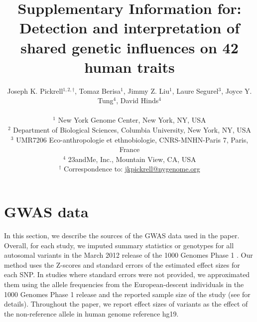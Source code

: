 \documentclass[11pt,titlepage]{article}
\begin{document}
\title{Supplementary Information for: Detection and interpretation of shared genetic influences on 42 human traits}
\author{Joseph K. Pickrell$^{1,2, \dagger}$, Tomaz Berisa${^1}$, Jimmy Z. Liu${^1}$, Laure Segurel$^{3}$, Joyce Y. Tung${^4}$, David Hinds${^4}$\\ \\
\small $^1$ New York Genome Center, New York, NY, USA\\
\small $^2$ Department of Biological Sciences, Columbia University, New York, NY, USA \\
\small $^3$ UMR7206 Eco-anthropologie et ethnobiologie, CNRS-MNHN-Paris 7, Paris, France\\
\small $^4$ 23andMe, Inc., Mountain View, CA, USA\\
\small $^\dagger$ Correspondence to: \url{jkpickrell@nygenome.org}
}
\maketitle

\tableofcontents
\clearpage

\section{GWAS data}
In this section, we describe the sources of the GWAS data used in the paper. Overall, for each study, we imputed summary statistics or genotypes for all autosomal variants in the March 2012 release of the 1000 Genomes Phase 1 \citep{abecasis2010map}. Our method uses the Z-scores and standard errors of the estimated effect sizes for each SNP. In studies where standard errors were not provided, we approximated them using the allele frequencies from the European-descent individuals in the 1000 Genomes Phase 1 release and the reported sample size of the study (see \citet{pickrell2013joint} for details). Throughout the paper, we report effect sizes of variants as the effect of the non-reference allele in human genome reference hg19. 
  
\end{document}
